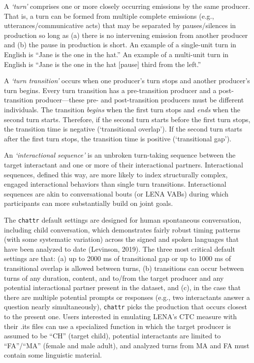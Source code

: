 \documentclass[10pt, letterpaper]{article}
\begin{document}
A \emph{`turn'} comprises one or more closely occurring emissions by the
same producer. That is, a turn can be formed from multiple complete
emissions (e.g., utterances/communicative acts) that may be separated by
pauses/silences in production so long as (a) there is no intervening
emission from another producer and (b) the pause in production is short.
An example of a single-unit turn in English is ``Jane is the one in the
hat.'' An example of a multi-unit turn in English is ``Jane is the one
in the hat {[}pause{]} third from the left.''

A \emph{`turn transition'} occurs when one producer's turn stops and
another producer's turn begins. Every turn transition has a
pre-transition producer and a post-transition producer---these pre- and
post-transition producers must be different individuals. The transition
\emph{begins} when the first turn stops and \emph{ends} when the second
turn starts. Therefore, if the second turn starts before the first turn
stops, the transition time is negative (`transitional overlap'). If the
second turn starts after the first turn stops, the transition time is
positive (`transitional gap').

An \emph{`interactional sequence'} is an unbroken turn-taking sequence
between the target interactant and one or more of their interactional
partners. Interactional sequences, defined this way, are more likely to
index structurally complex, engaged interactional behaviors than single
turn transitions. Interactional sequences are akin to conversational
bouts (or LENA VABs) during which participants can more substantially
build on joint goals.

The \texttt{chattr} default settings are designed for human spontaneous
conversation, including child conversation, which demonstrates fairly
robust timing patterns (with some systematic variation) across the
signed and spoken languages that have been analyzed to date (Levinson,
2019). The three most critical default settings are that: (a) up to 2000
ms of transitional gap or up to 1000 ms of transitional overlap is
allowed between turns, (b) transitions can occur between turns of any
duration, content, and to/from the target producer and any potential
interactional partner present in the dataset, and (c), in the case that
there are multiple potential prompts or responses (e.g., two
interactants answer a question nearly simultaneously), \texttt{chattr}
picks the production that occurs closest to the present one. Users
interested in emulating LENA's CTC measure with their .its files can use
a specialized function in which the target producer is assumed to be
``CH'' (target child), potential interactants are limited to
``FA''/``MA'' (female and male adult), and analyzed turns from MA and FA
must contain some linguistic material.
\end{document}
